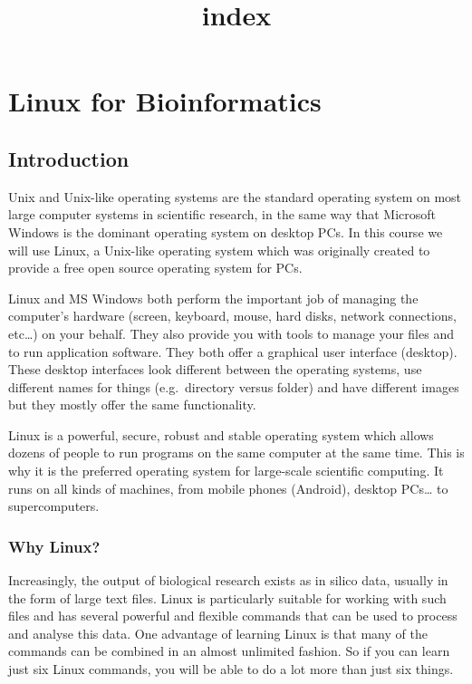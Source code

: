 \documentclass[11pt]{article}
\title{index}
\begin{document}
    \hypertarget{linux-for-bioinformatics}{%
\section{Linux for Bioinformatics}\label{linux-for-bioinformatics}}

\hypertarget{introduction}{%
\subsection{Introduction}\label{introduction}}

Unix and Unix-like operating systems are the standard operating system
on most large computer systems in scientific research, in the same way
that Microsoft Windows is the dominant operating system on desktop PCs.
In this course we will use Linux, a Unix-like operating system which was
originally created to provide a free open source operating system for
PCs.

Linux and MS Windows both perform the important job of managing the
computer's hardware (screen, keyboard, mouse, hard disks, network
connections, etc\ldots) on your behalf. They also provide you with tools
to manage your files and to run application software. They both offer a
graphical user interface (desktop). These desktop interfaces look
different between the operating systems, use different names for things
(e.g.~directory versus folder) and have different images but they mostly
offer the same functionality.

Linux is a powerful, secure, robust and stable operating system which
allows dozens of people to run programs on the same computer at the same
time. This is why it is the preferred operating system for large-scale
scientific computing. It runs on all kinds of machines, from mobile
phones (Android), desktop PCs\ldots{} to supercomputers.

\hypertarget{why-linux}{%
\subsubsection{Why Linux?}\label{why-linux}}

Increasingly, the output of biological research exists as in silico
data, usually in the form of large text files. Linux is particularly
suitable for working with such files and has several powerful and
flexible commands that can be used to process and analyse this data. One
advantage of learning Linux is that many of the commands can be combined
in an almost unlimited fashion. So if you can learn just six Linux
commands, you will be able to do a lot more than just six things.
\end{document}

